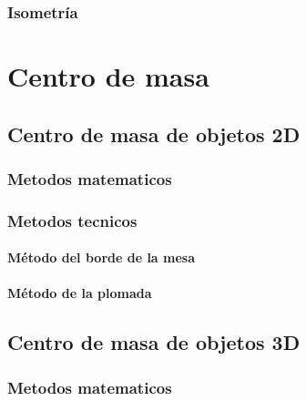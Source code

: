 \documentclass[
  16pt,
]{krantz}
\theoremstyle{definition}
\theoremstyle{definition}
\theoremstyle{definition}
\theoremstyle{definition}
\theoremstyle{remark}
\begin{document}
\hypertarget{isometruxeda}{%
\subsection{Isometría}\label{isometruxeda}}

\hypertarget{centro-de-masa}{%
\chapter{Centro de masa}\label{centro-de-masa}}

\hypertarget{centro-de-masa-de-objetos-2d}{%
\section{Centro de masa de objetos 2D}\label{centro-de-masa-de-objetos-2d}}

\hypertarget{metodos-matematicos}{%
\subsection{Metodos matematicos}\label{metodos-matematicos}}

\hypertarget{metodos-tecnicos}{%
\subsection{Metodos tecnicos}\label{metodos-tecnicos}}

\hypertarget{muxe9todo-del-borde-de-la-mesa}{%
\subsubsection{Método del borde de la mesa}\label{muxe9todo-del-borde-de-la-mesa}}

\hypertarget{muxe9todo-de-la-plomada}{%
\subsubsection{Método de la plomada}\label{muxe9todo-de-la-plomada}}

\hypertarget{centro-de-masa-de-objetos-3d}{%
\section{Centro de masa de objetos 3D}\label{centro-de-masa-de-objetos-3d}}

\hypertarget{metodos-matematicos-1}{%
\subsection{Metodos matematicos}\label{metodos-matematicos-1}}
\end{document}
